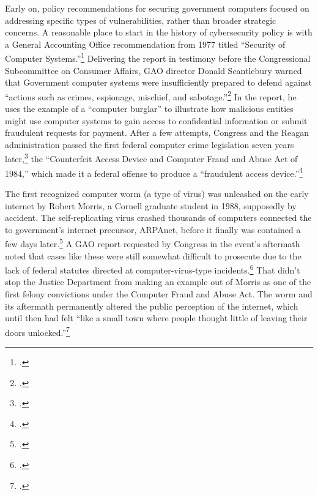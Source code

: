 \documentclass{report}
\begin{document}
\begin{refsegment}
Early on, policy recommendations for securing government computers focused on addressing specific types of vulnerabilities, rather than broader strategic concerns. A reasonable place to start in the history of cybersecurity policy is with a General Accounting Office recommendation from 1977 titled ``Security of Computer Systems.''\footcite{washington_post_staff_timeline_2003} Delivering the report in testimony before the Congressional Subcommittee on Consumer Affairs, GAO director Donald Scantlebury warned that Government computer systems were insufficiently prepared to defend against ``actions such as crimes, espionage, mischief, and sabotage.''\footcite{u.s._government_accounting_office_security_1977} In the report, he uses the example of a ``computer burglar'' to illustrate how malicious entities might use computer systems to gain access to confidential information or submit fraudulent requests for payment. After a few attempts, Congress and the Reagan administration passed the first federal computer crime legislation seven years later,\footcite[This later bill, the Computer Security Act of 1987, describes the 1984 bill as being the first federal legislation in this area.]{glickman_computer_1988} the ``Counterfeit Access Device and Computer Fraud and Abuse Act of 1984,'' which made it a federal offense to produce a ``fraudulent access device.''\footcite{hughes_access_1984}

The first recognized computer worm (a type of virus) was unleashed on the early internet by Robert Morris, a Cornell graduate student in 1988, supposedly by accident. The self-replicating virus crashed thousands of computers connected the to government's internet precursor, ARPAnet, before it finally was  contained a few days later.\footcite[This source, a master's thesis for the USAF Air University, makes the dramatic and completely unsubstantiated claim that the Morris worm infected half of of ARPAnet's 88,000 computers. The more popular (and plausible) claim is that of the roughly 60,000 ARPAnet-connected computers, the worm infected 10\% of them, though that number is not particularly well substantiated either.]{moore_conception_2014} A GAO report requested by Congress in the event's aftermath noted that cases like these were still somewhat difficult to prosecute due to the lack of federal statutes directed at computer-virus-type incidents.\footcite{u._s._government_accounting_office_computer_1989} That didn't stop the Justice Department from making an example out of Morris as one of the first felony convictions under the Computer Fraud and Abuse Act. The worm and its aftermath permanently altered the public perception of the internet, which until then had felt ``like a small town where people thought little of leaving their doors unlocked.''\footcite{lee_how_2013}


\end{refsegment}
\end{document}
